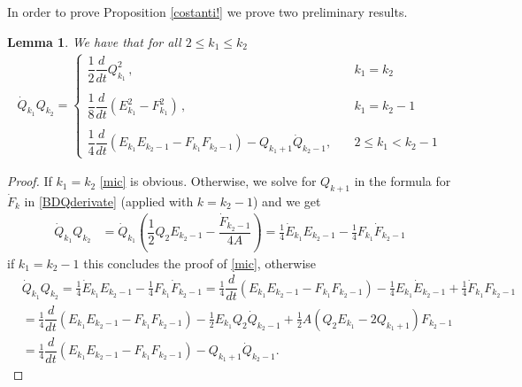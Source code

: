 \documentclass[reqno,11pt]{amsart}
\theoremstyle{plain}
\numberwithin{equation}{section}
\newtheorem{lemma}[theorem]{Lemma}
\newcommand{\ddt}{\dfrac{d}{dt}}
\begin{document}
{\smallskip 
In order to prove Proposition \ref{costanti!} we prove two preliminary results.
\begin{lemma}
	We have that for all $2\leq  k_1\leq  k_2$
	\begin{equation}\label{mic}
		\begin{aligned}
			\dot{Q}_{k_1}Q_{k_2}=\begin{cases}
				\dfrac12 \ddt Q_{k_1}^2 \,,&\quad k_1= k_2 \\ &\\
				\dfrac18 \ddt (E_{k_1}^2 - F_{k_1}^2) \,, & \quad k_1= k_2-1\\ &\\
				\dfrac{1}{4}\ddt\left(E_{k_1}E_{k_2-1}-F_{k_1}F_{k_2-1}\right)-  Q_{k_1+1}\dot{Q}_{k_2-1}, &\quad 2\leq   k_1< k_2-1 
			\end{cases}
		\end{aligned}
	\end{equation}
\end{lemma}
\begin{proof}
	If $k_1=k_2$  \eqref{mic} is obvious. Otherwise, we solve for $Q_{k+1}$ in the formula for $\dot F_k$ in \eqref{BDQderivate} (applied with $k=k_2-1$) and we get
	\begin{equation}\label{mic2}
		\begin{aligned}
			\dot{Q}_{k_1}Q_{k_2}&= \dot Q_{k_1} \left(\dfrac{1}{2}Q_{2}E_{k_2-1}-\dfrac{\dot{F}_{k_2-1}}{4A}\right)= \frac14 \dot E_{k_1}E_{k_2-1} -\frac14 F_{k_1}\dot F_{k_2-1}
		\end{aligned}
	\end{equation}
	if $k_1= k_2-1$ this concludes the proof of \eqref{mic}, otherwise
	\[
	\begin{aligned}
		&\dot{Q}_{k_1}Q_{k_2}= \frac14 \dot E_{k_1}E_{k_2-1} -\frac14 F_{k_1}\dot F_{k_2-1} = \frac14\ddt ( E_{k_1}E_{k_2-1}-F_{k_1}F_{k_2-1}) -\frac14 E_{k_1}  \dot E_{k_2-1} +\frac14 \dot F_{k_1} F_{k_2-1}
		\\
		&= \frac14\ddt ( E_{k_1}E_{k_2-1}-F_{k_1}F_{k_2-1}) -\frac12 E_{k_1} Q_2 \dot Q_{k_2-1} +\frac 12 A( Q_2 E_{k_1} -2 Q_{k_1+1} ) F_{k_2-1}
		\\
		&= \frac14\ddt ( E_{k_1}E_{k_2-1}-F_{k_1}F_{k_2-1}) - Q_{k_1+1} \dot Q_{k_2-1}.
	\end{aligned}
	\]
\end{proof}

}
\end{document}
